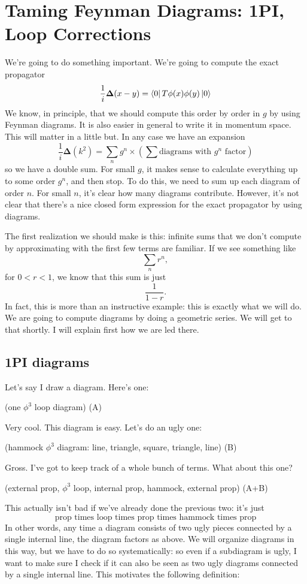 \documentclass{book}
\begin{document}
\chapter{Taming Feynman Diagrams: 1PI, Loop Corrections}
We're going to do something important. We're going to compute the exact propagator 
\[
\frac{1}{i}\mathbf{\Delta}(x-y) = \bra{0} T \phi(x) \phi(y) \ket{0}
\]
We know, in principle, that we should compute this order by order in $g$ by using Feynman diagrams. It is also easier in general to write it in momentum space. This will matter in a little but. In any case we have an expansion
\[
\frac{1}{i}\mathbf{\Delta}(k^2) = \sum_n g^n \times \left( \sum \text{diagrams with $g^n$ factor} \right)
\]
so we have a double sum. For small $g$, it makes sense to calculate everything up to some order $g^n$, and then stop. To do this, we need to sum up each diagram of order $n$. For small $n$, it's clear how many diagrams contribute. However, it's not clear that there's a nice closed form expression for the exact propagator by using diagrams.

The first realization we should make is this: infinite sums that we don't compute by approximating with the first few terms are familiar. If we see something like
\[
\sum_n r^n,
\]
for $0 < r < 1$, we know that this sum is just
\[
\frac{1}{1-r}.
\]
In fact, this is more than an instructive example: this is exactly what we will do. We are going to compute diagrams by doing a geometric series. We will get to that shortly. I will explain first how we are led there. \newpage

\section{1PI diagrams}
Let's say I draw a diagram. Here's one:

(one $\phi^3$ loop diagram) (A)

Very cool. This diagram is easy. Let's do an ugly one:

(hammock $\phi^3$ diagram: line, triangle, square, triangle, line) (B)

Gross. I've got to keep track of a whole bunch of terms. What about this one?

(external prop, $\phi^3$ loop, internal prop, hammock, external prop) (A+B)

This actually isn't bad if we've already done the previous two: it's just
\[
\text{prop times loop times prop times hammock times prop}
\]
In other words, any time a diagram consists of two ugly pieces connected by a single internal line, the diagram factors as above. We will organize diagrams in this way, but we have to do so systematically: so even if a subdiagram is ugly, I want to make sure I check if it can also be seen as two ugly diagrams connected by a single internal line. This motivates the following definition:
\end{document}

